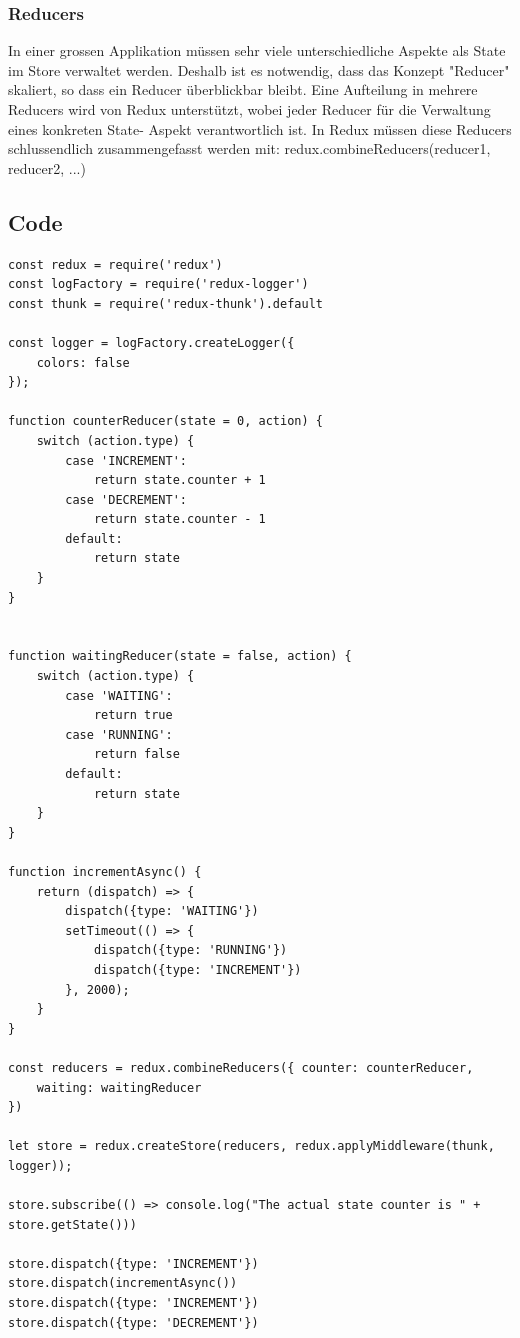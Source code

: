 \subsubsection{Reducers}

In einer grossen Applikation müssen sehr viele unterschiedliche Aspekte als State im Store verwaltet werden. Deshalb ist es notwendig, dass das Konzept "Reducer" skaliert, so dass ein Reducer überblickbar bleibt.
Eine Aufteilung in mehrere Reducers wird von Redux unterstützt, wobei jeder Reducer für die Verwaltung eines konkreten State- Aspekt verantwortlich ist.
In Redux müssen diese Reducers schlussendlich zusammengefasst werden mit: redux.combineReducers({reducer1, reducer2, ...})

\subsection{Code}
\begin{verbatim}
const redux = require('redux')
const logFactory = require('redux-logger')
const thunk = require('redux-thunk').default

const logger = logFactory.createLogger({
    colors: false
});

function counterReducer(state = 0, action) {
    switch (action.type) {
        case 'INCREMENT':
            return state.counter + 1
        case 'DECREMENT':
            return state.counter - 1
        default:
            return state
    }
}


function waitingReducer(state = false, action) {
    switch (action.type) {
        case 'WAITING':
            return true
        case 'RUNNING':
            return false
        default:
            return state
    }
}

function incrementAsync() {
    return (dispatch) => {
        dispatch({type: 'WAITING'})
        setTimeout(() => {
            dispatch({type: 'RUNNING'})
            dispatch({type: 'INCREMENT'})
        }, 2000);
    }
}

const reducers = redux.combineReducers({ counter: counterReducer,
    waiting: waitingReducer
})

let store = redux.createStore(reducers, redux.applyMiddleware(thunk, logger));

store.subscribe(() => console.log("The actual state counter is " + store.getState()))

store.dispatch({type: 'INCREMENT'})
store.dispatch(incrementAsync())
store.dispatch({type: 'INCREMENT'})
store.dispatch({type: 'DECREMENT'})
\end{verbatim}

